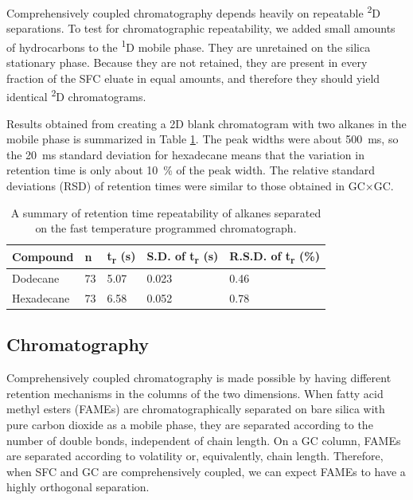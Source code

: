 \documentclass[aip,rsi,preprint,graphicx]{revtex4-1} %
\begin{document}
Comprehensively coupled chromatography depends heavily on repeatable
\textsuperscript{2}D separations. To test for chromatographic repeatability, we
added small amounts of hydrocarbons to the \textsuperscript{1}D mobile phase.
They are unretained on the silica stationary phase. Because they are not
retained, they are present in every fraction of the SFC eluate in equal amounts,
and therefore they should yield identical \textsuperscript{2}D chromatograms.

Results obtained from creating a 2D blank chromatogram with two alkanes in the
mobile phase is summarized in Table \ref{tab:table1}. The peak widths were about
\SI{500}{\milli\second}, so the \SI{20}{\milli\second} standard deviation for
hexadecane means that the variation in retention time is only about
\SI{10}{\percent} of the peak width. The relative standard deviations (RSD) of
retention times were similar to those obtained in GC×GC\cite{Shellie2002}.

\begin{table}

\caption{\label{tab:table1}A summary of retention time repeatability of alkanes
separated on the fast temperature programmed chromatograph.}

\begin{ruledtabular}
\begin{tabular}{lllll}
Compound & n & t\textsubscript{r} (s) & S.D. of t\textsubscript{r} (s)& R.S.D. of t\textsubscript{r} (\%)\\
\hline
Dodecane & 73 & 5.07 & 0.023 & 0.46\\
Hexadecane & 73 & 6.58 & 0.052 & 0.78\\
\end{tabular}
\end{ruledtabular}
\end{table}

\subsection{Chromatography}

Comprehensively coupled chromatography is made possible by having different
retention mechanisms in the columns of the two dimensions. When fatty acid
methyl esters (FAMEs) are chromatographically separated on bare silica with pure
carbon dioxide as a mobile phase, they are separated according to the number of
double bonds, independent of chain length\cite{Smith2001}. On a GC column, FAMEs
are separated according to volatility or, equivalently, chain length. Therefore,
when SFC and GC are comprehensively coupled, we can expect FAMEs to have a
highly orthogonal separation.
\end{document}
